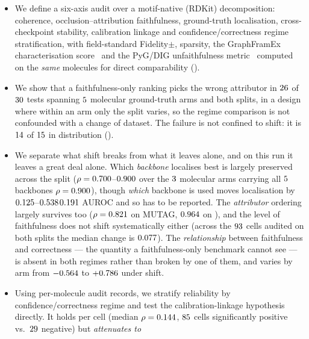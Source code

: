 \begin{itemize}\itemsep2pt
\item We define a six-axis audit over a motif-native (RDKit) decomposition:
  coherence, occlusion--attribution faithfulness, ground-truth localisation,
  cross-checkpoint stability, calibration linkage and confidence/correctness
  regime stratification, with field-standard Fidelity$\pm$, sparsity, the
  GraphFramEx characterisation score~\cite{graphframex} and the PyG/DIG
  unfaithfulness metric~\cite{dig} computed on the \emph{same} molecules for
  direct comparability ().
\item We show that a faithfulness-only ranking picks the wrong attributor in
  $26{}$ of $30{}$ tests spanning $5{}$ molecular
  ground-truth arms and both splits, in a design where within an arm only the
  split varies, so the regime comparison is not confounded with a change of
  dataset. The failure is not confined to shift: it is
  $14{}$ of $15{}$ in distribution
  ().
\item We separate what shift breaks from what it leaves alone, and on this run
  it leaves a great deal alone. Which \emph{backbone} localises best is largely
  preserved across the split
  (\ifHasBackboneArms$\rho=0.700{}$--$0.900{}$ over the
  $3{}$ molecular arms carrying all $5{}$ backbones\else
  $\rho=0.900{}$\fi), though \emph{which} backbone is used moves
  localisation by
  \ifHasBackboneArms$0.125{}$--$0.538{}$\else$0.191{}$\fi{}
  AUROC and so has to be reported. The
  \emph{attributor} ordering largely survives too ($\rho=0.821{}$ on
  MUTAG, $0.964{}$ on \molDataset{}), and the level of faithfulness
  does not shift systematically either (across the $93{}$ cells
  audited on both splits the median change is $0.077{}$). The
  \emph{relationship} between faithfulness and correctness --- the quantity a
  faithfulness-only benchmark cannot see --- is absent in both regimes rather
  than broken by one of them, and varies by arm from $-0.564{}$ to
  $+0.786{}$ under shift.
\item Using \nRecords{} per-molecule audit records, we
  stratify reliability by confidence/correctness regime and test the
  calibration-linkage hypothesis directly. It holds per cell
  (median $\rho=0.144{}$, $85{}$ cells significantly positive
  vs.\ $29{}$ negative) but \emph{attenuates to
}
\end{itemize}

